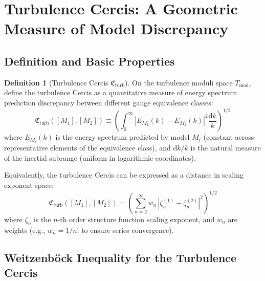 \documentclass[12pt,a4paper]{article}
\theoremstyle{plain}
\theoremstyle{definition}
\newtheorem{definition}[theorem]{Definition}
\theoremstyle{remark}
\newcommand{\cercis}{\mathfrak{C}}
\newcommand{\Tmod}{T_{\text{mod}}}
\newcommand{\diff}{\mathrm{d}}
\begin{document}
\section{Turbulence Cercis: A Geometric Measure of Model Discrepancy}

\subsection{Definition and Basic Properties}

\begin{definition}[Turbulence Cercis $\cercis_{\text{turb}}$]
On the turbulence moduli space $\Tmod$, define the turbulence Cercis as a quantitative measure of energy spectrum prediction discrepancy between different gauge equivalence classes:
\begin{equation}
\cercis_{\text{turb}}([M_1], [M_2]) \equiv \left(\int_{0}^{\infty} \left|E_{M_1}(k) - E_{M_2}(k)\right|^2 \frac{\diff k}{k}\right)^{1/2}
\label{eq:cercis_def}
\end{equation}
where $E_{M_i}(k)$ is the energy spectrum predicted by model $M_i$ (constant across representative elements of the equivalence class), and $\diff k/k$ is the natural measure of the inertial subrange (uniform in logarithmic coordinates).

Equivalently, the turbulence Cercis can be expressed as a distance in scaling exponent space:
\begin{equation}
\cercis_{\text{turb}}([M_1], [M_2]) = \left(\sum_{n=2}^{\infty} w_n\,|\zeta_n^{(1)} - \zeta_n^{(2)}|^2\right)^{1/2}
\end{equation}
where $\zeta_n$ is the $n$-th order structure function scaling exponent, and $w_n$ are weights (e.g., $w_n = 1/n!$ to ensure series convergence).
\end{definition}

\subsection{Weitzenb\"ock Inequality for the Turbulence Cercis}
\end{document}
